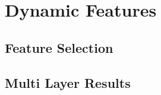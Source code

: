
\chapter{Dynamic Features}
\label{chapter:dynamic_features}

\section{Feature Selection}
\label{section:feature_selection_dynamic}

\section{Multi Layer Results}
\label{section:multi_layer_results_dynamic}
